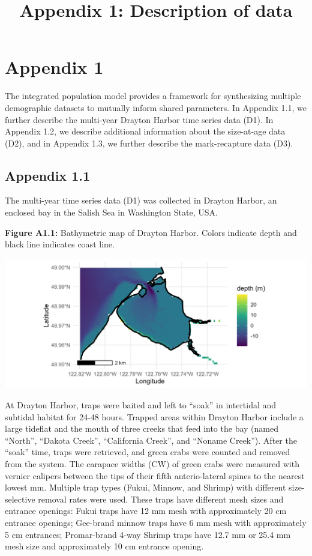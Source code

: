 \documentclass[
]{article}
\title{Appendix 1: Description of data}
\author{}
\date{\vspace{-2.5em}}
\begin{document}
\maketitle

\section{Appendix 1}\label{appendix-1}

The integrated population model provides a framework for synthesizing
multiple demographic datasets to mutually inform shared parameters. In
Appendix 1.1, we further describe the multi-year Drayton Harbor time
series data (D1). In Appendix 1.2, we describe additional information
about the size-at-age data (D2), and in Appendix 1.3, we further
describe the mark-recapture data (D3).

\subsection{Appendix 1.1}\label{appendix-1.1}

The multi-year time series data (D1) was collected in Drayton Harbor, an
enclosed bay in the Salish Sea in Washington State, USA.

\textbf{Figure A1.1:} Bathymetric map of Drayton Harbor. Colors indicate
depth and black line indicates coast line.

\includegraphics[width=38.89in]{../figures/supplemental_map}

At Drayton Harbor, traps were baited and left to ``soak'' in intertidal
and subtidal habitat for 24-48 hours. Trapped areas within Drayton
Harbor include a large tideflat and the mouth of three creeks that feed
into the bay (named ``North'', ``Dakota Creek'', ``California Creek'',
and ``Noname Creek''). After the ``soak'' time, traps were retrieved,
and green crabs were counted and removed from the system. The carapace
widths (CW) of green crabs were measured with vernier calipers between
the tips of their fifth anterio-lateral spines to the nearest lowest mm.
Multiple trap types (Fukui, Minnow, and Shrimp) with different
size-selective removal rates were used. These traps have different mesh
sizes and entrance openings: Fukui traps have 12 mm mesh with
approximately 20 cm entrance openings; Gee-brand minnow traps have 6 mm
mesh with approximately 5 cm entrances; Promar-brand 4-way Shrimp traps
have 12.7 mm or 25.4 mm mesh size and approximately 10 cm entrance
opening.
\end{document}
